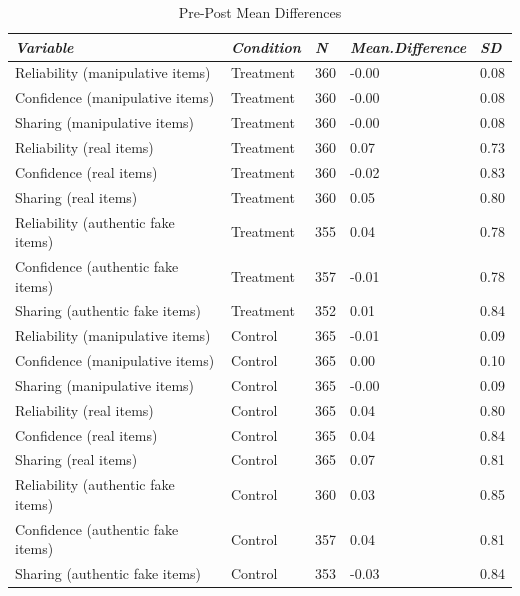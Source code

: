 \documentclass[empirical, authordate, issue]{jote-new-article}
\begin{document}
\begin{table}

  \caption{Pre-Post Mean Differences}
  \label{tab:tableS25}


  \begin{tabularx}{\linewidth}{@{} X  l  l  l  l@{}}

    \toprule
    \emph{Variable}                    & \emph{Condition} & \emph{N} & \emph{Mean.Difference} & \emph{SD} \\
    \midrule
    Reliability (manipulative items)   & Treatment        & 360      & -0.00                  & 0.08      \\
    Confidence (manipulative items)    & Treatment        & 360      & -0.00                  & 0.08      \\
    Sharing (manipulative items)       & Treatment        & 360      & -0.00                  & 0.08      \\
    Reliability (real items)           & Treatment        & 360      & 0.07                   & 0.73      \\
    Confidence (real items)            & Treatment        & 360      & -0.02                  & 0.83      \\
    Sharing (real items)               & Treatment        & 360      & 0.05                   & 0.80      \\
    Reliability (authentic fake items) & Treatment        & 355      & 0.04                   & 0.78      \\
    Confidence (authentic fake items)  & Treatment        & 357      & -0.01                  & 0.78      \\
    Sharing (authentic fake items)     & Treatment        & 352      & 0.01                   & 0.84      \\
    Reliability (manipulative items)   & Control          & 365      & -0.01                  & 0.09      \\
    Confidence (manipulative items)    & Control          & 365      & 0.00                   & 0.10      \\
    Sharing (manipulative items)       & Control          & 365      & -0.00                  & 0.09      \\
    Reliability (real items)           & Control          & 365      & 0.04                   & 0.80      \\
    Confidence (real items)            & Control          & 365      & 0.04                   & 0.84      \\
    Sharing (real items)               & Control          & 365      & 0.07                   & 0.81      \\
    Reliability (authentic fake items) & Control          & 360      & 0.03                   & 0.85      \\
    Confidence (authentic fake items)  & Control          & 357      & 0.04                   & 0.81      \\
    Sharing (authentic fake items)     & Control          & 353      & -0.03                  & 0.84      \\
    \bottomrule
  \end{tabularx}


\end{table}
\end{document}
